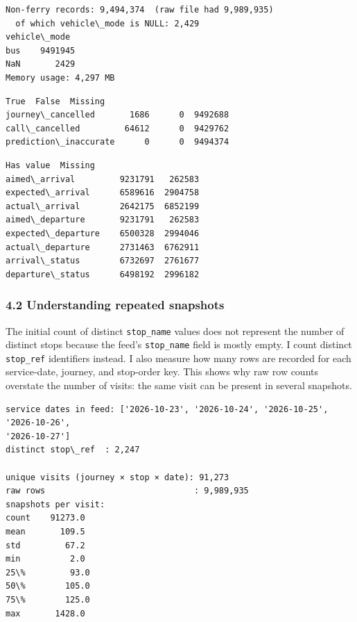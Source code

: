 \documentclass[11pt]{article}
\begin{document}
    \begin{Verbatim}[commandchars=\\\{\}]
Non-ferry records: 9,494,374  (raw file had 9,989,935)
  of which vehicle\_mode is NULL: 2,429
vehicle\_mode
bus    9491945
NaN       2429
Memory usage: 4,297 MB
    \end{Verbatim}

    
    \begin{Verbatim}[commandchars=\\\{\}]
                        True  False  Missing
journey\_cancelled       1686      0  9492688
call\_cancelled         64612      0  9429762
prediction\_inaccurate      0      0  9494374
    \end{Verbatim}

    
    
    \begin{Verbatim}[commandchars=\\\{\}]
                    Has value  Missing
aimed\_arrival         9231791   262583
expected\_arrival      6589616  2904758
actual\_arrival        2642175  6852199
aimed\_departure       9231791   262583
expected\_departure    6500328  2994046
actual\_departure      2731463  6762911
arrival\_status        6732697  2761677
departure\_status      6498192  2996182
    \end{Verbatim}

    
    \subsubsection{4.2 Understanding repeated
snapshots}\label{understanding-repeated-snapshots}

The initial count of distinct \texttt{stop\_name} values does not
represent the number of distinct stops because the feed's
\texttt{stop\_name} field is mostly empty. I count distinct
\texttt{stop\_ref} identifiers instead. I also measure how many rows are
recorded for each service-date, journey, and stop-order key. This shows
why raw row counts overstate the number of visits: the same visit can be
present in several snapshots.

    \begin{Verbatim}[commandchars=\\\{\}]
service dates in feed: ['2026-10-23', '2026-10-24', '2026-10-25', '2026-10-26',
'2026-10-27']
distinct stop\_ref  : 2,247

unique visits (journey × stop × date): 91,273
raw rows                              : 9,989,935
snapshots per visit:
count    91273.0
mean       109.5
std         67.2
min          2.0
25\%         93.0
50\%        105.0
75\%        125.0
max       1428.0
    \end{Verbatim}
\end{document}
